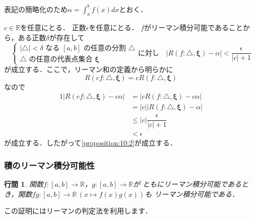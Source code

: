 \documentclass[uplatex]{jsarticle}
\makeatletter
\renewenvironment{proof}[1][\proofname]{\par
        \pushQED{\qed}
        \normalfont
        \topsep6\p@\@plus6\p@ \trivlist
        \item[\hskip\labelsep{\bfseries #1}\@addpunct{\bfseries}]\ignorespaces
    }{%
        \popQED\endtrivlist\@endpefalse
    }
\renewcommand{\proofname}{\underline{証明.}}
\newtheorem{proposition}{行間}
\makeatother
\begin{document}
\begin{proof}
    表記の簡略化のため$\alpha = \int_a^b f(x) dx$とおく．

    $c \in \mathbb{R}$を任意にとる．
    正数$\epsilon$を任意にとる．
    $f$がリーマン積分可能であることから，ある正数$\delta$が存在して
    \begin{equation}
        \nonumber
        \begin{cases}
            |\triangle| < \delta \mbox{ なる } [a, b] \mbox{ の任意の分割 } \triangle \\
            \triangle \mbox{ の任意の代表点集合 } \mathbf{\xi}
        \end{cases}
        \mbox{に対し} \quad
        |R(f: \triangle, \mathbf{\xi}) - \alpha| < \dfrac{\epsilon}{|c| + 1}
    \end{equation}
    が成立する．ここで，リーマン和の定義から明らかに
    \begin{equation}
        R(cf: \triangle, \mathbf{\xi}) = cR(f: \triangle, \mathbf{\xi})
    \end{equation}
    なので
    \begin{alignat}{1}
        |R(cf: \triangle, \mathbf{\xi}) - c\alpha|
            &= |cR(f: \triangle, \mathbf{\xi}) - c\alpha| \\
            &= |c||R(f: \triangle, \mathbf{\xi}) - \alpha| \\
            &\leq |c| \dfrac{\epsilon}{|c| + 1} \\
            &< \epsilon
    \end{alignat}
    が成立する．したがって\cref{proposition:10:2}が成立する．
\end{proof}

\subsubsection{積のリーマン積分可能性}

\begin{screen}
    \begin{proposition}
        関数$f:[a,b] \rightarrow \mathbb{R}$，$g:[a,b] \rightarrow \mathbb{R}$が
        ともにリーマン積分可能であるとき，関数$fg:[a,b] \rightarrow \mathbb{R}\,(x \mapsto f(x)g(x))$も
        リーマン積分可能である．
    \end{proposition}
\end{screen}

この証明にはリーマンの判定法を利用します．
\end{document}
